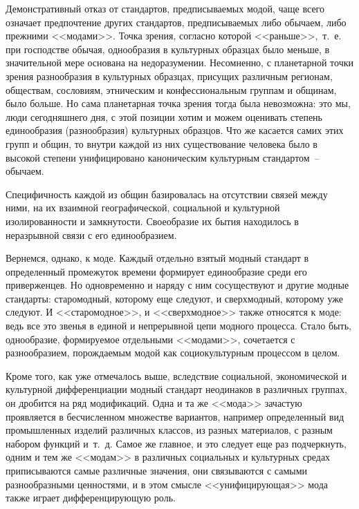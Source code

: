   Демонстративный отказ от стандартов, предписываемых модой, чаще всего означает
  предпочтение других стандартов, предписываемых либо обычаем, либо прежними
  <<модами>>. Точка зрения, согласно которой <<раньше>>,~т.~е. при господстве
  обычая, однообразия в культурных образцах было меньше, в значительной мере
  основана на недоразумении. Несомненно, с планетарной точки зрения разнообразия
  в культурных образцах, присущих различным регионам, обществам, сословиям,
  этническим и конфессиональным группам и общинам, было больше. Но сама
  планетарная точка зрения тогда была невозможна: это мы, люди сегодняшнего дня,
  с этой позиции хотим и можем оценивать степень единообразия (разнообразия)
  культурных образцов. Что же касается самих этих групп и общин, то внутри
  каждой из них существование человека было в высокой степени унифицировано
  каноническим культурным стандартом~-- обычаем.
  
  Специфичность каждой из общин базировалась на отсутствии связей между ними, на
  их взаимной географической, социальной и культурной изолированности и
  замкнутости. Своеобразие их бытия находилось в неразрывной связи с его
  единообразием.
  
  Вернемся, однако, к моде. Каждый отдельно взятый модный стандарт в
  определенный промежуток времени формирует единообразие среди его приверженцев.
  Но одновременно и наряду с ним сосуществуют и другие модные стандарты:
  старомодный, которому еще следуют, и сверхмодный, которому уже следуют. И
  <<старомодное>>, и <<сверхмодное>> также относятся к моде: ведь все это звенья
  в единой и непрерывной цепи модного процесса. Стало быть, однообразие,
  формируемое отдельными <<модами>>, сочетается с разнообразием, порождаемым
  модой как социокультурным процессом в целом.
  
  Кроме того, как уже отмечалось выше, вследствие социальной, экономической и
  культурной дифференциации модный стандарт неодинаков в различных группах, он
  дробится на ряд модификаций. Одна и та же <<мода>> зачастую проявляется в
  бесчисленном множестве вариантов, например определенный вид промышленных
  изделий различных классов, из разных материалов, с разным набором функций
  и~т.~д. Самое же главное, и это следует еще раз подчеркнуть, одним и тем же
  <<модам>> в различных социальных и культурных средах приписываются самые
  различные значения, они связываются с самыми разнообразными ценностями, и в
  этом смысле <<унифицирующая>> мода также играет дифференцирующую роль.
  
